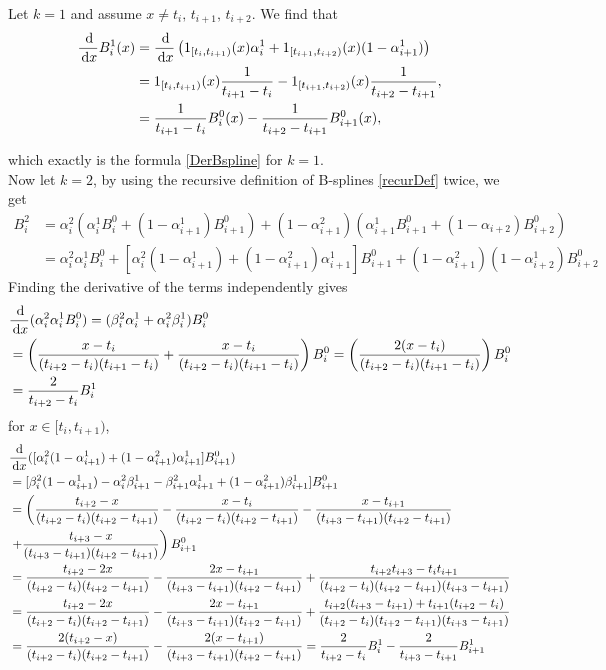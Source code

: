 Let $k=1$ and assume $x\neq t_i,\,t_{i+1},\,t_{i+2}$. We find that
\begin{align}
  \frac{\,{\rm d}}{\,{\rm d} x} B_i^1(x) &= \frac{\,{\rm d}}{\,{\rm d} x} \left(1_{[t_i,t_{i+1})}(x) \alpha_i^1 + 1_{[t_{i+1},t_{i+2})}(x) (1-\alpha_{i+1}^1)\right)\\
  &= 1_{[t_i,t_{i+1})}(x) \frac{1}{t_{i+1}-t_{i}} - 1_{[t_{i+1},t_{i+2})}(x) \frac{1}{t_{i+2}-t_{i+1}},\\
  &= \frac{1}{t_{i+1}-t_{i}}B_i^0(x) - \frac{1}{t_{i+2}-t_{i+1}} B_{i+1}^0(x),
\end{align}

which exactly is the formula \eqref{DerBspline} for $k=1$.\\

Now let $k=2$, by using the recursive definition of B-splines \eqref{recurDef} twice, we get
\begin{align}
  B_i^2 &= \alpha_i^2(\alpha_i^1 B_i^0 + (1-\alpha_{i+1}^1)B_{i+1}^0) + (1-\alpha_{i+1}^2)(\alpha_{i+1}^1B_{i+1}^0 + (1-\alpha_{i+2})B_{i+2}^0)\\
  &= \alpha_i^2\alpha_i^1B_i^0 + [\alpha_i^2(1-\alpha_{i+1}^1) + (1-\alpha_{i+1}^2)\alpha_{i+1}^1]B_{i+1}^0 + (1-\alpha_{i+1}^2)(1-\alpha_{i+2}^1)B_{i+2}^0
\end{align}
Finding the derivative of the terms independently gives
\begin{align}
  &\frac{\,{\rm d}}{\,{\rm d} x} (\alpha_i^2\alpha_i^1B_i^0) = (\beta_i^2\alpha_i^1 + \alpha_i^2\beta_i^1)B_i^0\\
  &= \left(\frac{x-t_i}{(t_{i+2}-t_i)(t_{i+1}-t_i)} + \frac{x-t_i}{(t_{i+2}-t_i)(t_{i+1}-t_i)}\right)B_i^0 = \left(\frac{2(x-t_i)}{(t_{i+2}-t_i)(t_{i+1}-t_i)}\right)B_i^0\\
  & = \frac{2}{t_{i+2}-t_i}B_i^1
\end{align}
for $x\in [t_i,t_{i+1})$, 
\begin{align}
  &\frac{\,{\rm d}}{\,{\rm d} x} ([\alpha_i^2(1-\alpha_{i+1}^1) + (1-\alpha_{i+1}^2)\alpha_{i+1}^1]B_{i+1}^0)\\
  &= [\beta_i^2(1-\alpha_{i+1}^1) - \alpha_i^2\beta_{i+1}^1 - \beta_{i+1}^2\alpha_{i+1}^1 + (1-\alpha_{i+1}^2)\beta_{i+1}^1]B_{i+1}^0\\
  &= \left(\frac{t_{i+2}-x}{(t_{i+2}-t_i)(t_{i+2}-t_{i+1})}-\frac{x-t_i}{(t_{i+2}-t_i)(t_{i+2}-t_{i+1})} - \frac{x-t_{i+1}}{(t_{i+3}-t_{i+1})(t_{i+2}-t_{i+1})}\right.\\
  &\left.+ \frac{t_{i+3}-x}{(t_{i+3}-t_{i+1})(t_{i+2}-t_{i+1})}\right)B_{i+1}^0\\ 
  &= \frac{t_{i+2}-2x}{(t_{i+2}-t_i)(t_{i+2}-t_{i+1})}-\frac{2x-t_{i+1}}{(t_{i+3}-t_{i+1})(t_{i+2}-t_{i+1})} + \frac{t_{i+2}t_{i+3}-t_it_{i+1}}{(t_{i+2}-t_i)(t_{i+2}-t_{i+1})(t_{i+3}-t_{i+1})}\\
  &= \frac{t_{i+2}-2x}{(t_{i+2}-t_i)(t_{i+2}-t_{i+1})}-\frac{2x-t_{i+1}}{(t_{i+3}-t_{i+1})(t_{i+2}-t_{i+1})} + \frac{t_{i+2}(t_{i+3}-t_{i+1}) + t_{i+1}(t_{i+2}-t_i)}{(t_{i+2}-t_i)(t_{i+2}-t_{i+1})(t_{i+3}-t_{i+1})}\\
  &= \frac{2(t_{i+2}-x)}{(t_{i+2}-t_i)(t_{i+2}-t_{i+1})}-\frac{2(x-t_{i+1})}{(t_{i+3}-t_{i+1})(t_{i+2}-t_{i+1})} = \frac{2}{t_{i+2}-t_i} B_i^1 - \frac{2}{t_{i+3}-t_{i+1}} B_{i+1}^1 
\end{align}
